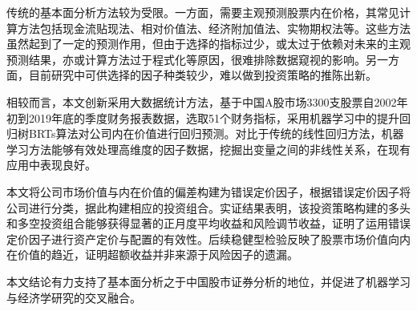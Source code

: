 
传统的基本面分析方法较为受限。一方面，需要主观预测股票内在价格，其常见计算方法包括现金流贴现法、相对价值法、经济附加值法、实物期权法等。这些方法虽然起到了一定的预测作用，但由于选择的指标过少，或太过于依赖对未来的主观预测结果，亦或计算方法过于程式化等原因，很难排除数据窥视的影响。另一方面，目前研究中可供选择的因子种类较少，难以做到投资策略的推陈出新。

相较而言，本文创新采用大数据统计方法，基于中国A股市场3300支股票自2002年初到2019年底的季度财务报表数据，选取51个财务指标，采用机器学习中的提升回归树BRTs算法对公司内在价值进行回归预测。对比于传统的线性回归方法，机器学习方法能够有效处理高维度的因子数据，挖掘出变量之间的非线性关系，在现有应用中表现良好。

本文将公司市场价值与内在价值的偏差构建为错误定价因子，根据错误定价因子将公司进行分类，据此构建相应的投资组合。实证结果表明，该投资策略构建的多头和多空投资组合能够获得显著的正月度平均收益和风险调节收益，证明了运用错误定价因子进行资产定价与配置的有效性。后续稳健型检验反映了股票市场价值向内在价值的趋近，证明超额收益并非来源于风险因子的遗漏。

本文结论有力支持了基本面分析之于中国股市证券分析的地位，并促进了机器学习与经济学研究的交叉融合。
